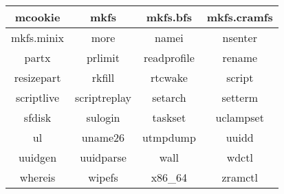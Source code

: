 \begin{itemize}
\begin{center}
\begin{tabular}{|c|c|c|c|}
                \hline
                mcookie & mkfs & mkfs.bfs & mkfs.cramfs \\
                \hline
                mkfs.minix & more & namei & nsenter \\
                \hline
                partx & prlimit & readprofile & rename \\
                \hline
                resizepart & rkfill & rtcwake & script \\
                \hline
                scriptlive & scriptreplay & setarch & setterm \\
                \hline
                sfdisk & sulogin & taskset & uclampset \\
                \hline
                ul & uname26 & utmpdump & uuidd \\
                \hline
                uuidgen & uuidparse & wall & wdctl \\
                \hline
                whereis & wipefs & x86\_64 & zramctl \\
                \hline
            \end{tabular}
        \end{center}
\end{itemize}